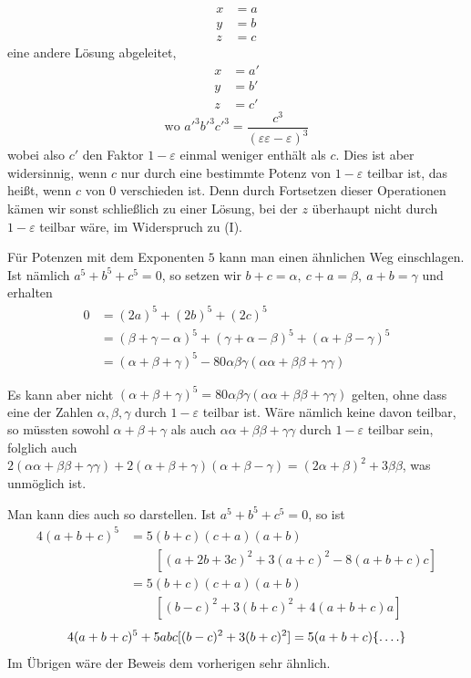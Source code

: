 %
\[
\begin{aligned}
x&=a\\
y&=b\\
z&=c
\end{aligned}
\]
eine andere Lösung abgeleitet,
\[
\begin{aligned}
x&=a'\\
y&=b'\\
z&=c'
\end{aligned}
\]
\[
\text{wo }a'^3b'^3c'^3=\frac{c^3}{(\varepsilon\varepsilon-\varepsilon)^3}
\]
wobei also $c'$ den Faktor $1-\varepsilon$ einmal weniger enthält als $c$. Dies ist aber widersinnig, wenn $c$ nur durch eine bestimmte Potenz von $1-\varepsilon$ teilbar ist, das heißt, wenn $c$ von $0$ verschieden ist. Denn durch Fortsetzen dieser Operationen kämen wir sonst schließlich zu einer Lösung, bei der $z$ überhaupt nicht durch $1-\varepsilon$ teilbar wäre, im Widerspruch zu (I).

Für Potenzen mit dem Exponenten $5$ kann man einen ähnlichen Weg einschlagen. Ist nämlich $a^5+b^5+c^5=0$, so setzen wir $b+c=\alpha,\ c+a=\beta,\ a+b=\gamma$ und erhalten
\[
\begin{aligned}
0&=(2a)^5+(2b)^5+(2c)^5\\
&=(\beta+\gamma-\alpha)^5+(\gamma+\alpha-\beta)^5+(\alpha+\beta-\gamma)^5\\
&=(\alpha+\beta+\gamma)^5-80\alpha\beta\gamma(\alpha\alpha+\beta\beta+\gamma\gamma)
\end{aligned}
\]

Es kann aber nicht $(\alpha+\beta+\gamma)^5=80\alpha\beta\gamma(\alpha\alpha+\beta\beta+\gamma\gamma)$ gelten, ohne dass eine der Zahlen $\alpha,\beta,\gamma$ durch $1-\varepsilon$ teilbar ist. Wäre nämlich keine davon teilbar, so müssten sowohl $\alpha+\beta+\gamma$ als auch $\alpha\alpha+\beta\beta+\gamma\gamma$ durch $1-\varepsilon$ teilbar sein, folglich auch $2(\alpha\alpha+\beta\beta+\gamma\gamma)+2(\alpha+\beta+\gamma)(\alpha+\beta-\gamma)=(2\alpha+\beta)^2+3\beta\beta$, was unmöglich ist.

Man kann dies auch so darstellen. Ist $a^5+b^5+c^5=0$, so ist
\[
\begin{aligned}
4(a+b+c)^5&=5(b+c)(c+a)(a+b)\\
&\qquad[(a+2b+3c)^2+3(a+c)^2-8(a+b+c)c]\\
&=5(b+c)(c+a)(a+b)\\
&\qquad[(b-c)^2+3(b+c)^2+4(a+b+c)a]
\end{aligned}
\]
\[
4(a+b+c)^5+5abc[(b-c)^2+3(b+c)^2]=5(a+b+c)\{\mathinner{.\,.\,.\,.}\}
\]
Im Übrigen wäre der Beweis dem vorherigen sehr ähnlich.

